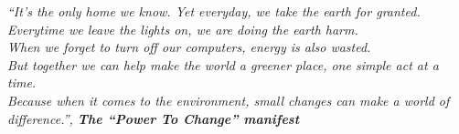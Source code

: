 




\pretextualchapter{}

\vspace{17.5cm}
\begin{flushright}

\textit{``It's the only home we know. Yet everyday, we take the earth for granted.\\
        Everytime we leave the lights on, we are doing the earth harm.\\
        When we forget to turn off our computers, energy is also wasted.\\
        But together we can help make the world a greener place, one simple act at a time.\\
        Because when it comes to the environment, small changes can make a world of difference.'',
	\bfseries The ``Power To Change'' manifest}

\end{flushright}



